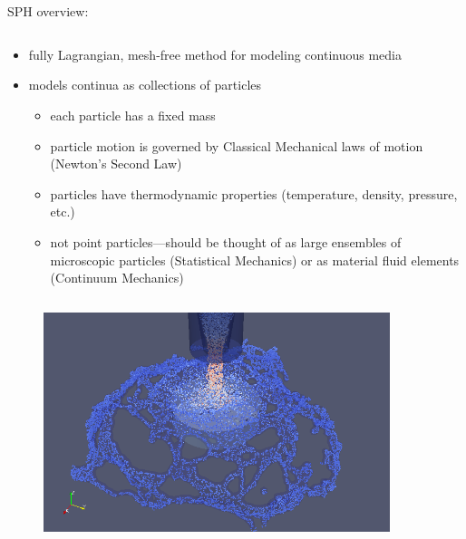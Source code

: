 \section{\thesec}
\label{sec:methodology}


\begin{frame}{\thesec}{\thesubsec}
  \vspace*{-2\baselineskip}
  \begin{block}{SPH overview:}
    \begin{columns}
      \begin{column}{0.9\paperwidth}
        \begin{itemize}
          \item{
            fully Lagrangian, mesh-free method for modeling continuous media
          }
		  \item{ 
		    models continua as collections of \alert{particles}
		    \begin{itemize}
		        \item{ each particle has a fixed mass }
		        \item{ 
		          particle motion is governed by Classical Mechanical laws of motion (Newton's Second Law)
		        }
		        \item{
		          particles have thermodynamic properties (temperature, density, pressure, etc.)
		        }
		        \item{
		          not point particles---should be thought of as large ensembles of microscopic particles (Statistical Mechanics) or as material fluid elements (Continuum Mechanics)
		        }
		    \end{itemize}
		  }
        \end{itemize}
      \end{column}
    \end{columns}
  \end{block}
\end{frame}

\begin{frame}{\thesec}{\thesubsec}
  \vspace*{-2.1\baselineskip}
  \begin{figure}
    \centering
    \includegraphics[width=0.9\textwidth]{img/ren_marshall_close.png}
  \end{figure}
\end{frame}

